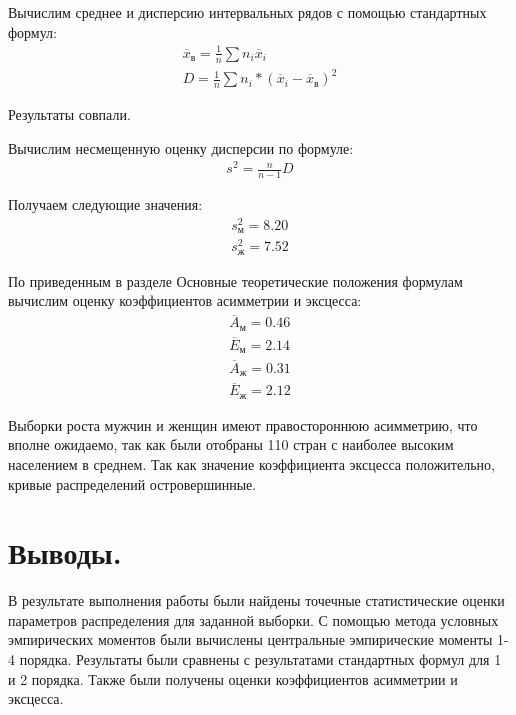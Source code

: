 Вычислим среднее и дисперсию интервальных рядов с помощью стандартных формул:
\begin{gather*}
    \overline{x}_\text{в} = \frac{1}{n} \sum n_i \overline{x}_i \\
    D = \frac{1}{n} \sum n_i * (\overline{x}_i - \overline{x}_\text{в})^2
\end{gather*}

Результаты совпали.

Вычислим несмещенную оценку дисперсии по формуле:
\begin{gather*}
    s^2 = \frac{n}{n-1} D
\end{gather*}

Получаем следующие значения:
\begin{gather*}
    s^2_\text{м} = 8.20 \\
    s^2_\text{ж} = 7.52
\end{gather*}

По приведенным в разделе Основные теоретические положения формулам вычислим оценку коэффициентов асимметрии и эксцесса:
\begin{gather*}
    \overline{A}_\text{м} = 0.46 \\
    \overline{E}_\text{м} = 2.14 \\
    \overline{A}_\text{ж} = 0.31 \\
    \overline{E}_\text{ж} = 2.12
\end{gather*}

Выборки роста мужчин и женщин имеют правостороннюю асимметрию, что вполне ожидаемо, так как
были отобраны 110 стран с наиболее высоким населением в среднем.
Так как значение коэффициента эксцесса положительно, кривые распределений островершинные.

\section*{Выводы.}
В результате выполнения работы были найдены точечные статистические оценки параметров
распределения для заданной выборки.
С помощью метода условных эмпирических моментов были вычислены центральные эмпирические моменты
1-4 порядка.
Результаты были сравнены с результатами стандартных формул для 1 и 2 порядка.
Также были получены оценки коэффициентов асимметрии и эксцесса.